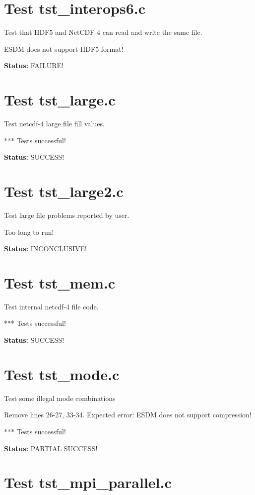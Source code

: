 \section{Test tst\_interops6.c}

Test that HDF5 and NetCDF-4 can read and write the same file.

ESDM does not support HDF5 format!

{\bf \large Status: } FAILURE!

\section{Test tst\_large.c}

Test netcdf-4 large file fill values.

*** Tests successful!

{\bf \large Status: } SUCCESS!

\section{Test tst\_large2.c}

Test large file problems reported by user.

Too long to run!

{\bf \large Status: } INCONCLUSIVE!

\section{Test tst\_mem.c}

Test internal netcdf-4 file code.

*** Tests successful!

{\bf \large Status: } SUCCESS!

\section{Test tst\_mode.c}

Test some illegal mode combinations

Remove lines 26-27, 33-34. Expected error: ESDM does not support compression!

*** Tests successful!

{\bf \large Status: } PARTIAL SUCCESS!

\section{Test tst\_mpi\_parallel.c}

